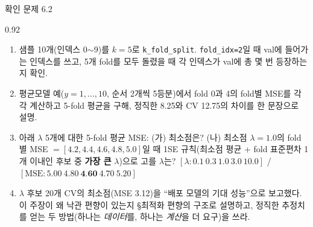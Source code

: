 \begin{frame}{확인 문제 6.2}
\begin{center}\begin{varwidth}{0.92\textwidth}
  \small
  \begin{enumerate}
    \item 샘플 10개(인덱스 0$\sim$9)를 $k=5$로 \texttt{k\_fold\_split}.
      \texttt{fold\_idx=2}일 때 val에 들어가는 인덱스를 쓰고, 5개 fold를
      모두 돌렸을 때 각 인덱스가 val에 총 몇 번 등장하는지 확인.
    \item 평균모델 예($y=1,\dots,10$, 순서 2개씩 5등분)에서 fold 0과 4의
      fold별 MSE를 각각 계산하고 5-fold 평균을 구해, 정직한 8.25와 CV 12.75의
      차이를 한 문장으로 설명.
    \item 아래 $\lambda$ 5개에 대한 5-fold 평균 MSE: (가) 최소점은? (나)
      최소점 $\lambda=1.0$의 fold별 MSE $=[4.2,4.4,4.6,4.8,5.0]$일 때
      1SE 규칙(최소점 평균 + fold 표준편차 1개 이내인 후보 중 \textbf{가장
      큰} $\lambda$)으로 고를 $\lambda$는?
      \newline\newline
      {\footnotesize $[\lambda: 0.1\ 0.3\ 1.0\ 3.0\ 10.0]$ /
      $[\text{MSE}: 5.00\ 4.80\ \textbf{4.60}\ 4.70\ 5.20]$}
    \item $\lambda$ 후보 20개 CV의 최소점(MSE 3.12)을 ``배포 모델의 기대
      성능''으로 보고했다. 이 주장이 왜 낙관 편향이 있는지 §최적화 편향의
      구조로 설명하고, 정직한 추정치를 얻는 두 방법(하나는 \emph{데이터}를,
      하나는 \emph{계산}을 더 요구)을 쓰라.
  \end{enumerate}
\end{varwidth}\end{center}
\end{frame}
